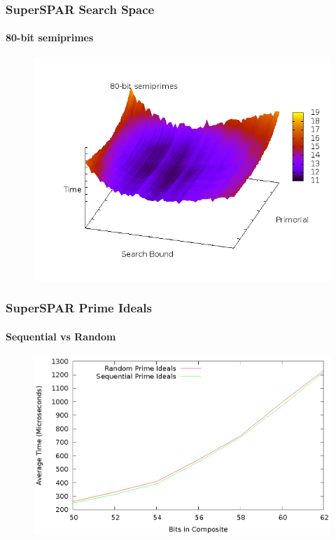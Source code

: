\documentclass{beamer}
\begin{document}
\begin{frame}
\frametitle{SuperSPAR Search Space}
\framesubtitle{80-bit semiprimes}
\begin{figure}
\includegraphics[scale=0.47]{bits-80-3d.png}
\end{figure}
\end{frame}

\begin{frame}
\frametitle{SuperSPAR Prime Ideals}
\framesubtitle{Sequential vs Random}
\begin{figure}
\includegraphics[scale=0.86]{sspar-random-vs-sequential}
\end{figure}
\end{frame}
\end{document}
